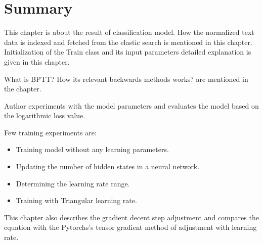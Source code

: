 \section{Summary}

This chapter is about the result of classification model. How the normalized text data is indexed and fetched from the elastic search is mentioned in this chapter. Initialization of the Train class and its input parameters detailed explanation is given in this chapter.  

What is \acf*{BPTT}? How its relevant backwards methods works? are mentioned in the chapter.

Author experiments with the model parameters and evaluates the model based on the logarithmic loss value. 

Few training experiments are:
\begin{itemize}
    \item Training model without any learning parameters.
    \item Updating the number of hidden states in a neural network.
    \item Determining the learning rate range.
    \item Training with Triangular learning rate.
\end{itemize}


This chapter also describes the gradient decent \parencite{cauchy} step adjustment and compares the equation with the Pytorchs's tensor gradient method of adjustment with learning rate.  